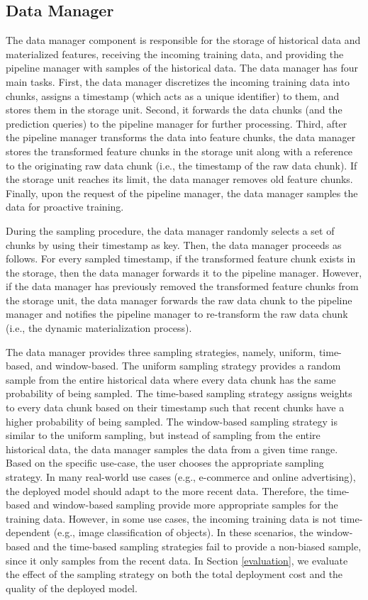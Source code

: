 \subsection{Data Manager} \label{data-manager}
The data manager component is responsible for the storage of historical data and materialized features, receiving the incoming training data, and providing the pipeline manager with samples of the historical data.
The data manager has four main tasks.
First, the data manager discretizes the incoming training data into chunks, assigns a timestamp (which acts as a unique identifier) to them, and stores them in the storage unit.
Second, it forwards the data chunks (and the prediction queries) to the pipeline manager for further processing.
Third, after the pipeline manager transforms the data into feature chunks, the data manager stores the transformed feature chunks in the storage unit along with a reference to the originating raw data chunk (i.e., the timestamp of the raw data chunk).
If the storage unit reaches its limit, the data manager removes old feature chunks.
Finally, upon the request of the pipeline manager, the data manager samples the data for proactive training.

During the sampling procedure, the data manager randomly selects a set of chunks by using their timestamp as key.
Then, the data manager proceeds as follows.
For every sampled timestamp, if the transformed feature chunk exists in the storage, then the data manager forwards it to the pipeline manager.
However, if the data manager has previously removed the transformed feature chunks from the storage unit, the data manager forwards the raw data chunk to the pipeline manager and notifies the pipeline manager to re-transform the raw data chunk (i.e., the dynamic materialization process).

The data manager provides three sampling strategies, namely, uniform, time-based, and window-based.
The uniform sampling strategy provides a random sample from the entire historical data where every data chunk has the same probability of being sampled.
The time-based sampling strategy assigns weights to every data chunk based on their timestamp such that recent chunks have a higher probability of being sampled.
The window-based sampling strategy is similar to the uniform sampling, but instead of sampling from the entire historical data, the data manager samples the data from a given time range. 
Based on the specific use-case, the user chooses the appropriate sampling strategy.
In many real-world use cases (e.g., e-commerce and online advertising), the deployed model should adapt to the more recent data.
Therefore, the time-based and window-based sampling provide more appropriate samples for the training data.
However, in some use cases, the incoming training data is not time-dependent (e.g., image classification of objects).
In these scenarios, the window-based and the time-based sampling strategies fail to provide a non-biased sample, since it only samples from the recent data.
In Section \ref{evaluation}, we evaluate the effect of the sampling strategy on both the total deployment cost and the quality of the deployed model.

